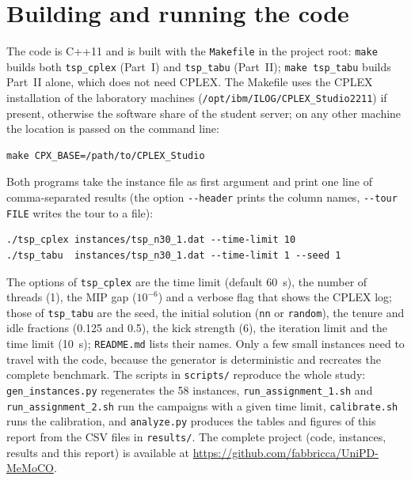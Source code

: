 \documentclass[11pt,a4paper]{article}
\begin{document}
\section{Building and running the code}\label{sec:build}
The code is C++11 and is built with the \texttt{Makefile} in the project root:
\texttt{make} builds both \texttt{tsp\_cplex} (Part~I) and \texttt{tsp\_tabu} (Part~II);
\texttt{make tsp\_tabu} builds Part~II alone, which does not need CPLEX. The Makefile uses the
CPLEX installation of the laboratory machines (\texttt{/opt/ibm/ILOG/CPLEX\_Studio2211}) if
present, otherwise the software share of the student server; on any other machine the
location is passed on the command line:
\begin{verbatim}
make CPX_BASE=/path/to/CPLEX_Studio
\end{verbatim}
Both programs take the instance file as first argument and print one line of comma-separated
results (the option \texttt{-{}-header} prints the column names, \texttt{-{}-tour FILE} writes the
tour to a file):
\begin{verbatim}
./tsp_cplex instances/tsp_n30_1.dat --time-limit 10
./tsp_tabu  instances/tsp_n30_1.dat --time-limit 1 --seed 1
\end{verbatim}
The options of \texttt{tsp\_cplex} are the time limit (default 60~s), the number of threads
(1), the MIP gap ($10^{-6}$) and a verbose flag that shows the CPLEX log; those of
\texttt{tsp\_tabu} are the seed, the initial solution (\texttt{nn} or \texttt{random}), the
tenure and idle fractions (0.125 and 0.5), the kick strength (6), the iteration limit and the
time limit (10~s); \texttt{README.md} lists their names. Only a few small instances need to travel with the code, because the generator is
deterministic and recreates the complete benchmark. The scripts in \texttt{scripts/} reproduce
the whole study:
\texttt{gen\_instances.py} regenerates the 58 instances, \texttt{run\_assignment\_1.sh} and
\texttt{run\_assignment\_2.sh} run the campaigns with a given time limit, \texttt{calibrate.sh} runs the
calibration, and \texttt{analyze.py} produces the tables and figures of this report from the
CSV files in \texttt{results/}. The complete project (code, instances, results and this report)
is available at \url{https://github.com/fabbricca/UniPD-MeMoCO}.
\end{document}
